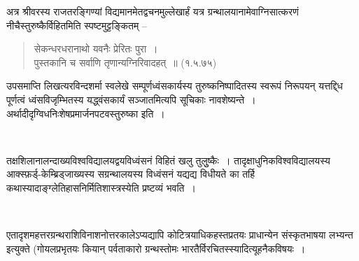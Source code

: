 अत्र श्रीवरस्य राजतरङ्गिण्यां विद्यमानमेतद्वचनमुल्लेखार्हं यत्र ग्रन्थालयानामेवाग्निसात्करणं नीचैस्तुरुष्कैर्विहितमिति स्पष्टमुट्टङ्कितम् –

\vskip 2pt

\begin{verse}
सेकन्धरधरानाथो यवनैः प्रेरितः पुरा~।\\ पुस्तकानि च सर्वाणि तृणान्यग्निरिवादहत्~॥ (१.५.७५)
\end{verse}

\vskip 2pt

उपसमाप्ति लिखत्यरविन्दशर्मा स्वलेखे सम्पूर्णध्वंसकार्यस्य तुरुष्कनिष्पादितस्य स्वरूपं निरूपयन् यत्तद्द्धि पूर्णत्वं ध्वंसविजृम्भितस्य यद्ध्वंसकार्यं सञ्जातमित्यपि सूचिकाः नावशेष्यन्ते~। अर्थादीदृग्विधनिःशेषप्रमार्जनपटवस्तुरुष्का इति~।

\begin{myquote}

\vskip -8pt

~\hfill {}
\end{myquote}

तक्षशिलानालन्दाख्यविश्वविद्यालयद्वयविध्वंसनं विहितं खलु तुलुुष्कैः~। तादृक्षाधुनिकविश्वविद्यालयस्य आक्स्फ़र्ड्-केम्ब्रिड्जाख्यस्य सग्रन्थालयस्य विध्वंसनं यद्यद्य विधीयते का तर्हि कथा\break स्यादाङ्ग्लेतिहासनिर्मितिशास्त्रस्येति प्रष्टव्यं भवति~।

\begin{myquote}

~\hfill {} 
\end{myquote}

एतादृशमहत्तरग्रन्थराशिविनाशनोत्तरकालेऽप्यद्यापि कोटित्रयाधिकहस्तप्रतयः प्राधान्येन संस्कृतभाषया लभ्यन्त इत्युक्ते (गोयलप्रभृतयः  कियान् पर्वताकारो ग्रन्थस्तोमः भारतैर्विरचितस्स्यादित्यूहनैकविषयः~।

